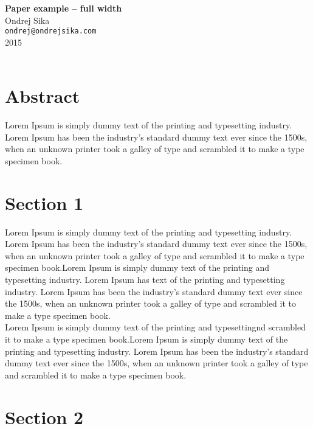 \documentclass[12pt,a4paper]{article}
\begin{document}

\begin{center}
{\LARGE \bf Paper example -- full width}\\
\vspace*{0.4cm}
{\large Ondrej Sika}\\
\vspace*{0.15cm}
{\tt ondrej@ondrejsika.com}\\
\vspace*{0.3cm}
{\small 2015}\\
\hrulefill\\
\end{center}


\section*{Abstract}

Lorem Ipsum is simply dummy text of the printing and typesetting industry. Lorem Ipsum has been the industry's standard dummy text ever since the 1500s, when an unknown printer took a galley of type and scrambled it to make a type specimen book.\\

\section{Section 1}

Lorem Ipsum is simply dummy text of the printing and typesetting industry. Lorem Ipsum has been the industry's standard dummy text ever since the 1500s, when an unknown printer took a galley of type and scrambled it to make a type specimen book.Lorem Ipsum is simply dummy text of the printing and typesetting industry. Lorem Ipsum has  text of the printing and typesetting industry. Lorem Ipsum has been the industry's standard dummy text ever since the 1500s, when an unknown printer took a galley of type and scrambled it to make a type specimen book.\\

Lorem Ipsum is simply dummy text of the printing and typesettingnd scrambled it to make a type specimen book.Lorem Ipsum is simply dummy text of the printing and typesetting industry. Lorem Ipsum has been the industry's standard dummy text ever since the 1500s, when an unknown printer took a galley of type and scrambled it to make a type specimen book.\\

\section{Section 2}
\end{document}
